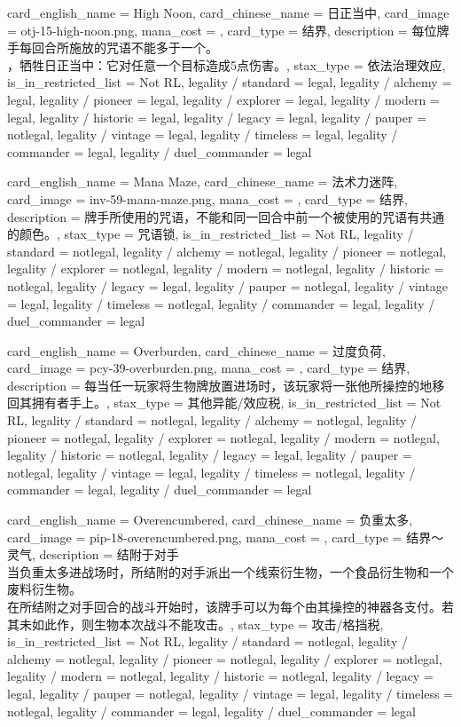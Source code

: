 \documentclass[lang = cn, color = black, 10pt]{AllThatStax}
\begin{document}
\card
{
	card_english_name = {High Noon},
	card_chinese_name = {日正当中},
	card_image = otj-15-high-noon.png,
	mana_cost = ,
	card_type = 结界,
	description = {每位牌手每回合所施放的咒语不能多于一个。\\
，牺牲日正当中：它对任意一个目标造成5点伤害。},
	stax_type = 依法治理效应,
	is_in_restricted_list = Not RL,
	legality / standard = legal,
	legality / alchemy = legal,
	legality / pioneer = legal,
	legality / explorer = legal,
	legality / modern = legal,
	legality / historic = legal,
	legality / legacy = legal,
	legality / pauper = notlegal,
	legality / vintage = legal,
	legality / timeless = legal,
	legality / commander = legal,
	legality / duel_commander = legal
}

\card
{
	card_english_name = {Mana Maze},
	card_chinese_name = {法术力迷阵},
	card_image = inv-59-mana-maze.png,
	mana_cost = ,
	card_type = 结界,
	description = {牌手所使用的咒语，不能和同一回合中前一个被使用的咒语有共通的颜色。},
	stax_type = 咒语锁,
	is_in_restricted_list = Not RL,
	legality / standard = notlegal,
	legality / alchemy = notlegal,
	legality / pioneer = notlegal,
	legality / explorer = notlegal,
	legality / modern = notlegal,
	legality / historic = notlegal,
	legality / legacy = legal,
	legality / pauper = notlegal,
	legality / vintage = legal,
	legality / timeless = notlegal,
	legality / commander = legal,
	legality / duel_commander = legal
}

\card
{
	card_english_name = {Overburden},
	card_chinese_name = {过度负荷},
	card_image = pcy-39-overburden.png,
	mana_cost = ,
	card_type = 结界,
	description = {每当任一玩家将生物牌放置进场时，该玩家将一张他所操控的地移回其拥有者手上。},
	stax_type = 其他异能/效应税,
	is_in_restricted_list = Not RL,
	legality / standard = notlegal,
	legality / alchemy = notlegal,
	legality / pioneer = notlegal,
	legality / explorer = notlegal,
	legality / modern = notlegal,
	legality / historic = notlegal,
	legality / legacy = legal,
	legality / pauper = notlegal,
	legality / vintage = legal,
	legality / timeless = notlegal,
	legality / commander = legal,
	legality / duel_commander = legal
}

\card
{
	card_english_name = {Overencumbered},
	card_chinese_name = {负重太多},
	card_image = pip-18-overencumbered.png,
	mana_cost = ,
	card_type = 结界～灵气,
	description = {结附于对手\\
当负重太多进战场时，所结附的对手派出一个线索衍生物，一个食品衍生物和一个废料衍生物。\\
在所结附之对手回合的战斗开始时，该牌手可以为每个由其操控的神器各支付。若其未如此作，则生物本次战斗不能攻击。},
	stax_type = 攻击/格挡税,
	is_in_restricted_list = Not RL,
	legality / standard = notlegal,
	legality / alchemy = notlegal,
	legality / pioneer = notlegal,
	legality / explorer = notlegal,
	legality / modern = notlegal,
	legality / historic = notlegal,
	legality / legacy = legal,
	legality / pauper = notlegal,
	legality / vintage = legal,
	legality / timeless = notlegal,
	legality / commander = legal,
	legality / duel_commander = legal
}
\end{document}
